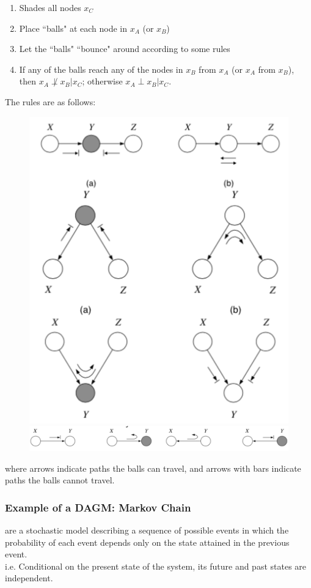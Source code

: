 \documentclass[11pt]{article}
\begin{document}
\begin{enumerate}
	\item Shades all nodes $x_C$
	\item Place ``balls" at each node in $x_A$ (or $x_B$)
	\item Let the ``balls" ``bounce" around according to some rules
	\item If any of the balls reach any of the nodes in $x_B$ from $x_A$ (or $x_A$ from $x_B$), then $x_A \not \perp x_B | x_C$; otherwise $x_A \perp x_B | x_C$.
\end{enumerate}
The rules are as follows:
 \begin{figure}[H]
	\centering
	\includegraphics[scale=0.3]{p6.png}
	\includegraphics[scale=0.3]{p7.png}
\end{figure}
\noindent where arrows indicate paths the balls can travel, and arrows with bars indicate paths the balls cannot travel.
\subsubsection{Example of a DAGM: Markov Chain}
 are a stochastic model describing a sequence of possible events in which the probability of each event depends only on the state attained in the previous event.\\
i.e. Conditional on the present state of the system, its future and past states are independent.
\end{document}
